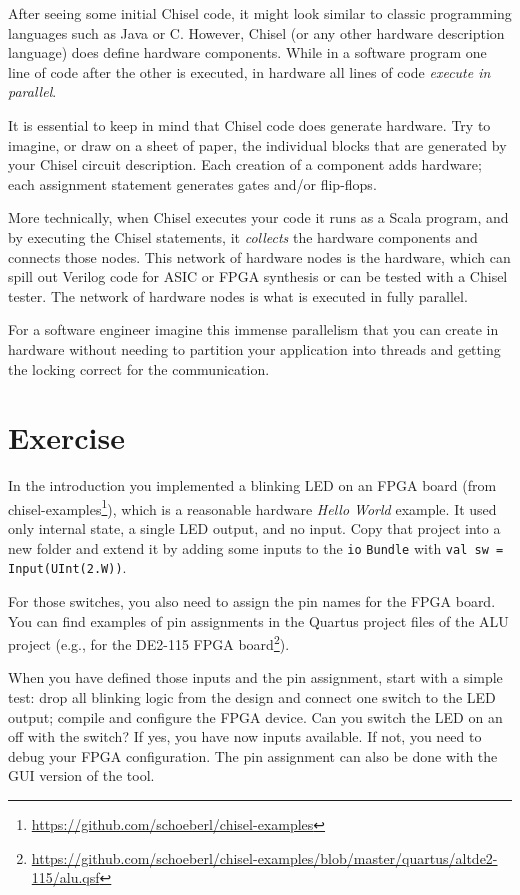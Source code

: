 \documentclass[%
    10pt,
    headinclude, footexclude,
    openright, %
    notitlepage,
    cleardoubleempty,
    headsepline,
    pointlessnumbers,
    bibtotoc, idxtotoc,
    ]{scrbook}
\newcommand{\code}[1]{{\small{\texttt{#1}}}}
\newcommand{\myref}[2]{\href{#1}{#2}}
\renewcommand{\myref}[2]{{#2}{\footnote{\url{#1}}}}
\begin{document}
After seeing some initial Chisel code, it might look similar to classic programming
languages such as Java or C. However, Chisel (or any other hardware description
language) does define hardware components. While in a software program one
line of code after the other is executed, in hardware all lines of code
\emph{execute in parallel}.

It is essential to keep in mind that Chisel code does generate hardware.
Try to imagine, or draw on a sheet of paper, the individual blocks that
are generated by your Chisel circuit description.
Each creation of a component adds hardware; each assignment statement
generates gates and/or flip-flops.

More technically, when Chisel executes your code it runs as a Scala program, and
by executing the Chisel statements, it \emph{collects} the hardware components
and connects those nodes. This network of hardware nodes is the hardware,
which can spill out Verilog code for ASIC or FPGA synthesis or can be
tested with a Chisel tester.
The network of hardware nodes is what is executed in fully parallel.

For a software engineer imagine this immense parallelism that you can
create in hardware without needing to partition your application into threads
and getting the locking correct for the communication.


\section{Exercise}

In the introduction you implemented a blinking LED on an FPGA board
(from \myref{https://github.com/schoeberl/chisel-examples}{chisel-examples}), which is a reasonable
hardware \emph{Hello World} example. It used only internal state, a single LED output, and no input.
Copy that project into a new folder and extend it by adding some inputs to the \code{io} \code{Bundle}
with \code{val sw = Input(UInt(2.W))}.


\noindent For those switches, you also need to assign the pin names for the FPGA board.
You can find examples of pin assignments in the Quartus project files of the ALU project
(e.g., for the \myref{https://github.com/schoeberl/chisel-examples/blob/master/quartus/altde2-115/alu.qsf}{DE2-115
FPGA board}).

When you have defined those inputs and the pin assignment, start with a simple test:
drop all blinking logic from the design and connect one switch to the LED output;
compile and configure the FPGA device. Can you switch the LED on an off with the switch?
If yes, you have now inputs available. If not, you need to debug your FPGA configuration.
The pin assignment can also be done with the GUI version of the tool.
\end{document}
